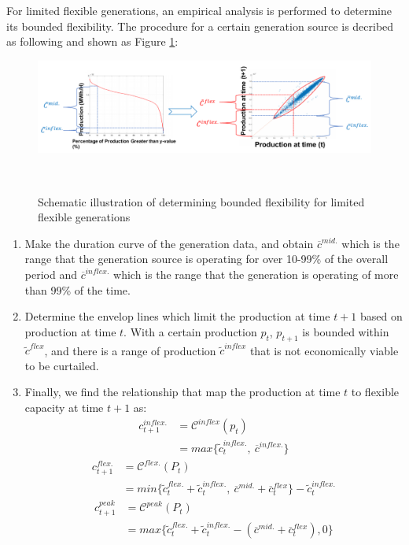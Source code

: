 For limited flexible generations, an empirical analysis is performed to determine its bounded flexibility. The procedure for a certain generation source is decribed as following and shown as Figure \ref{fig:bounded-flexibility}:

\begin{figure}[h!]
	\label{fig:bounded-flexibility}
	\includegraphics[scale=0.4]{Figures/BoundedFlexibility.pdf}
	\caption{Schematic illustration of determining bounded flexibility for limited flexible generations}\
\end{figure}


\begin{enumerate}
	\item Make the duration curve of the generation data, and obtain $\overline{c}^{mid.}$ which is the range that the generation source is operating for over 10-99\% of the overall period and $\overline{c}^{inflex.}$ which is the range that the generation is operating of more than 99\% of the time.
	\item Determine the envelop lines which limit the production at time $t+1$ based on production at time $t$. With a certain production $p_{t}$, $p_{t+1}$ is bounded within $\tilde{c}^{flex}$, and there is a range of production $\tilde{c}^{inflex}$ that is not economically viable to be curtailed.
	\item Finally, we find the relationship that map the production at time $t$ to flexible capacity at time $t+1$ as: 
	\begin{equation}
	\begin{aligned}
	c^{inflex.}_{t+1} &= \mathcal{C}^{inflex}(p_t)\\ &=max\{\tilde{c}^{inflex.}_t,~\overline{c}^{inflex.}\}
	\end{aligned}
	\end{equation}
	\begin{equation}
	\begin{aligned}
	c^{flex.}_{t+1} &= \mathcal{C}^{flex.}(P_t) \\ & =min\{\tilde{c}^{flex.}_t+\tilde{c}^{inflex.}_t,~\overline{c}^{mid.}+\overline{c}^{flex}_t \} - \tilde{c}^{inflex.}_t
	\end{aligned}
	\end{equation}
	\begin{equation}
	\begin{aligned}
	c^{peak}_{t+1} &= \mathcal{C}^{peak}(P_t) \\ & =max\{\tilde{c}^{flex.}_t+\tilde{c}^{inflex.}_t -(\overline{c}^{mid.}+\overline{c}^{flex}_t),0 \}
	\end{aligned}
	\end{equation}
\end{enumerate}

